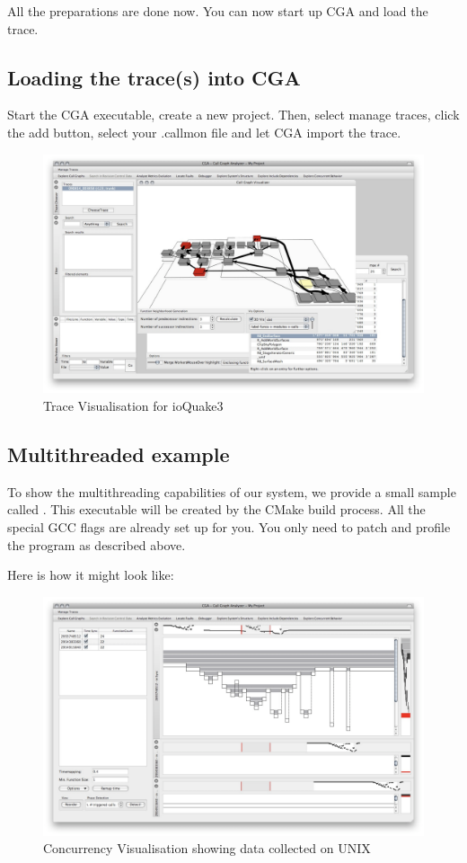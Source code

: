 All the preparations are done now. You can now start up CGA and load the trace.

\subsection{Loading the trace(s) into CGA} Start the CGA executable, create a new project. Then, select manage traces, click the add button, select your .callmon file and let CGA import the trace.

\begin{figure}[ht]
\centering
\includegraphics[width=16cm]{images/ioquake3_trace}
\caption{Trace Visualisation for ioQuake3}\label{fig:ioquake3_trace}
\end{figure}

\subsection{Multithreaded example} To show the multithreading capabilities of our system, we provide a small sample called . This executable will be created by the CMake build process. All the special GCC flags are already set up for you. You only need to patch and profile the program as described above.

Here is how it might look like:
\begin{figure}[ht]
\centering
\includegraphics[width=16cm]{images/cga_threads}
\caption{Concurrency Visualisation showing data collected on UNIX}\label{fig:cga_threads}
\end{figure}
